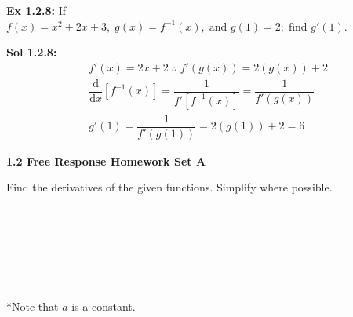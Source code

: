 \begin{center}
\end{center}

\begin{tcolorbox}[example]
    \textbf{Ex 1.2.8: } If $f(x) = x^2 + 2x + 3, \; g(x) = f^{-1}(x), \; \text{and } g(1) = 2; \; \text{find } g'(1)$. 
\end{tcolorbox}
\begin{tcolorbox}[solution]
    \textbf{Sol 1.2.8: } \begin{align*}
        & f'(x) = 2x + 2 \; \therefore \; f'\left(g(x)\right) = 2\left(g(x)\right) + 2 \\[11pt]
        & \dfrac{\mathrm{d}}{\mathrm{d}x} \left[f^{-1}(x)\right] = \dfrac{1}{f'\left[f^{-1}(x)\right]} = \dfrac{1}{f'\left(g(x)\right)} \\[11pt]
        & g'(1) = \dfrac{1}{f'\left(g(1)\right)} = 2\left(g(1)\right) + 2 = \boxed{6}
    \end{align*}
\end{tcolorbox}

\newpage

\textbf{\large{1.2 Free Response Homework Set A}} \par

Find the derivatives of the given functions. Simplify where possible. \par

 \\[11pt]
 \\[11pt]
 \\[11pt]
 \\[11pt]
 \\[11pt]
 \\[11pt]
*Note that $a$ is a constant. \par
\vspace{11pt}

